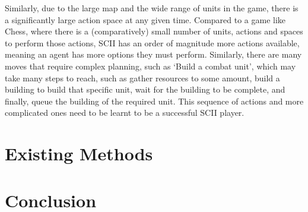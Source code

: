 Similarly, due to the large map and the wide range of units in the game, there
is a significantly large action space at any given time. Compared to a game like
Chess, where there is a (comparatively) small number of units, actions and
spaces to perform those actions, SCII has an order of magnitude more actions
available, meaning an agent has more options they must perform. Similarly, there
are many moves that require complex planning, such as `Build a
combat unit', which may take many steps to reach, such as gather
resources to some amount, build a building to build that specific unit, wait for
the building to be complete, and finally, queue the building of the required
unit. This sequence of actions and more complicated ones need to be learnt to
be a successful SCII player.

\section{Existing Methods}

\section{Conclusion}
